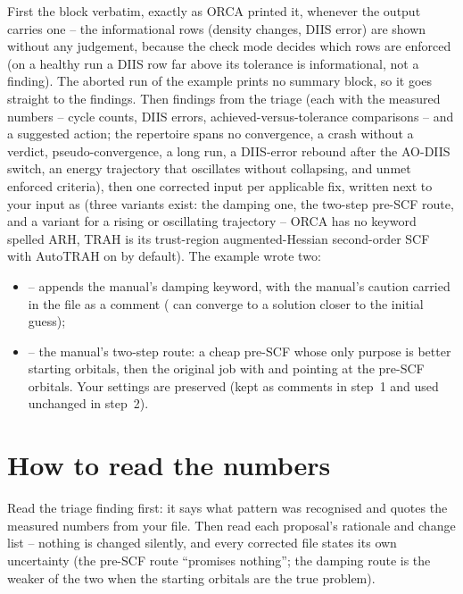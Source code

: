 First the  block verbatim, exactly as ORCA printed it,
whenever the output carries one -- the informational rows (density changes,
DIIS error) are shown without any judgement, because the check mode decides
which rows are enforced (on a healthy run a DIIS row far above its tolerance
is informational, not a finding). The aborted run of the example prints no
summary block, so it goes straight to the findings. Then findings from the
triage (each with the measured numbers -- cycle counts, DIIS
errors, achieved-versus-tolerance comparisons -- and a suggested action; the
repertoire spans no convergence, a crash without a verdict, pseudo-convergence,
a long run, a DIIS-error rebound after the AO-DIIS switch, an energy trajectory
that oscillates without collapsing, and unmet enforced criteria), then
one corrected input per applicable fix, written next to your input as
 (three variants exist: the damping
 one, the two-step pre-SCF route, and a  variant for
a rising or oscillating trajectory -- ORCA has no keyword spelled ARH, TRAH is
its trust-region augmented-Hessian second-order SCF with AutoTRAH on by
default). The example wrote two:

\begin{itemize}
  \item {} -- appends the manual's damping
    keyword, with the manual's caution carried in the file as a comment
    ( can converge to a solution closer to the initial guess);
  \item {} -- the manual's two-step route: a
    cheap pre-SCF whose only purpose is better starting orbitals, then the
    original job with  and  pointing at the pre-SCF
    orbitals. Your  settings are preserved (kept as comments in
    step~1 and used unchanged in step~2).
\end{itemize}

\section{How to read the numbers}

\begin{readbox}
Read the triage finding first: it says what pattern was recognised and quotes
the measured numbers from your file. Then read each proposal's rationale and
change list -- nothing is changed silently, and every corrected file states its
own uncertainty (the pre-SCF route ``promises nothing''; the damping route is
the weaker of the two when the starting orbitals are the true problem).
\end{readbox}

